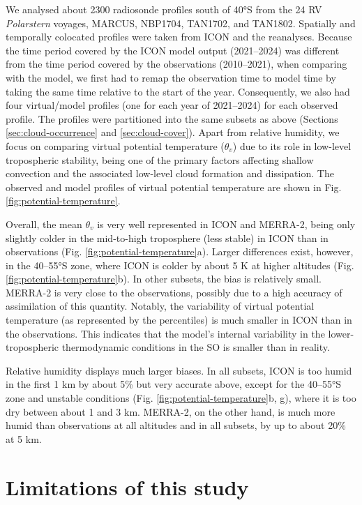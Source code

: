 \documentclass[12pt,a4paper]{article}
\begin{document}
We analysed about 2300 radiosonde profiles south of 40°S from the 24 RV
\emph{Polarstern} voyages, MARCUS, NBP1704, TAN1702, and TAN1802. Spatially and
temporally colocated profiles were taken from ICON and the reanalyses.
Because the time period covered by the ICON model output (2021--2024) was
different from the time period covered by the observations (2010--2021), when
comparing with the model, we first had to remap the observation time to model
time by taking the same time relative to the start of the year. Consequently,
we also had four virtual/model profiles (one for each year of 2021--2024) for
each observed profile.
The profiles were partitioned into the same subsets as
above (Sections \ref{sec:cloud-occurrence} and \ref{sec:cloud-cover}).  Apart
from relative humidity, we focus on comparing virtual potential temperature
($\theta_v$) due to its role in low-level tropospheric stability, being one of
the primary factors affecting shallow convection and the associated low-level
cloud formation and dissipation. The observed and model profiles of virtual
potential temperature are shown in Fig. \ref{fig:potential-temperature}.

Overall, the mean $\theta_v$ is very well represented in ICON and
MERRA-2, being only slightly colder in the mid-to-high troposphere (less
stable) in ICON than in observations (Fig. \ref{fig:potential-temperature}a).
Larger differences exist, however, in the 40--55°S zone, where ICON is colder by about 5 K at higher altitudes (Fig.
\ref{fig:potential-temperature}b). In other subsets, the bias is relatively
small. MERRA-2 is very close to the observations, possibly due to a high
accuracy of assimilation of this quantity. Notably, the variability of virtual
potential temperature (as represented by the percentiles) is much smaller in
ICON than in the observations. This indicates that the model's internal
variability in the lower-tropospheric thermodynamic conditions in the SO is
smaller than in reality.

Relative humidity displays much larger biases. In all subsets, ICON is too
humid in the first 1 km by about 5\% but very accurate above, except for the 40--55°S zone
and unstable conditions (Fig. \ref{fig:potential-temperature}b, g),  where it
is too dry between about 1 and 3 km. MERRA-2, on the other hand, is much more
humid than observations at all altitudes and in all subsets, by up to about
20\% at 5 km.

\section{Limitations of this study}
\end{document}
